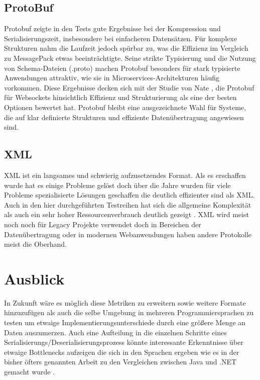 \documentclass[ngerman]{seminarvorlage}
\begin{document}
\subsection{ProtoBuf}
Protobuf zeigte in den Tests gute Ergebnisse bei der Kompression und Serialisierungszeit, insbesondere bei einfacheren Datensätzen. Für komplexe Strukturen nahm die Laufzeit jedoch spürbar zu, was die Effizienz im Vergleich zu MessagePack etwas beeinträchtigte. Seine strikte Typisierung und die Nutzung von Schema-Dateien (.proto) machen Protobuf besonders für stark typisierte Anwendungen attraktiv, wie sie in Microservices-Architekturen häufig vorkommen. Diese Ergebnisse decken sich mit der Studie von Nate \cite{Nate10_2024}, die Protobuf für Websockets hinsichtlich Effizienz und Strukturierung als eine der besten Optionen bewertet hat. Protobuf bleibt eine ausgezeichnete Wahl für Systeme, die auf klar definierte Strukturen und effiziente Datenübertragung angewiesen sind.

\subsection{XML}
XML ist ein langsames und schwierig aufzusetzendes Format. Als es erschaffen wurde hat es einige Probleme gelöst doch über die Jahre wurden für viele Probleme spezialisierte Lösungen geschaffen die deutlich effizienter sind als XML. Auch in den hier durchgeführten Testreihen hat sich die allgemeine Komplexität als auch ein sehr hoher Ressourcenverbrauch deutlich gezeigt \cite{Pommerenig_2019}. XML wird meist noch noch für Legacy Projekte verwendet doch in Bereichen der Datenübertragung oder in modernen Webanwendungen haben andere Protokolle meist die Oberhand.


\section{Ausblick}

In Zukunft wäre es möglich diese Metriken zu erweitern sowie weitere Formate hinzuzufügen als auch die selbe Umgebung in mehreren Programmiersprachen zu testen um etwaige Implementierungsunterschiede durch eine größere Menge an Daten auszumerzen. Auch eine Aufteilung in die einzelnen Schritte eines Serialisierungs/Deserialisierungsprozess könnte interessante Erkenntnisse über etwaige Bottlenecks aufzeigen die sich in den Sprachen ergeben wie es in der bisher öfters genannten Arbeit zu den Vergleichen zwischen Java und .NET gemacht wurde \cite{10.1145/944579.944589}. 
\end{document}
